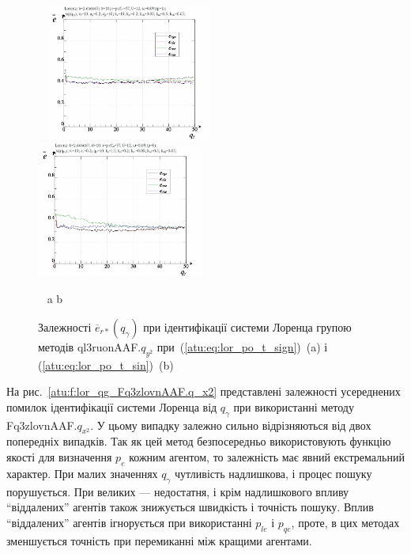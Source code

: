 \begin{figure}[ht!]
  \begin{center}
    ~ \hfill
    \includegraphics[width=0.49\textwidth]{p/cha/lor/ql3ruonAAF/lor_ql3ruonAAF_qy2-p_qgamma_e_sign.png}
    \hfill
    \includegraphics[width=0.49\textwidth]{p/cha/lor/ql3ruonAAF/lor_ql3ruonAAF_qy2-p_qgamma_e_sin.png}
    \hfill ~
  \end{center}
  \vspace{-1.0ex}
  \begin{center}
    ~ \hfill a \hfill\hfill b \hfill ~
  \end{center}
  \vspace{-1.5ex}
  \caption{Залежності $ \overline{e}_{r *} (q_\gamma) $ при ідентифікації системи Лоренца групою методів ql3ruonAAF.$q_{y^2} $ при~(\ref{atu:eq:lor_po_t_sign})~(a) і (\ref{atu:eq:lor_po_t_sin})~(b)}
  \label{atu:f:lor_qg_ql3ruonAAF.q_y2}
\end{figure}


На рис.~\ref{atu:f:lor_qg_Fq3zlovnAAF.q_x2} представлені залежності усереднених
помилок ідентифікації системи Лоренца від
$ q_\gamma $ при використанні методу
Fq3zlovnAAF.$q_{x^2}$.
У цьому випадку залежно сильно відрізняються від двох
попередніх випадків. Так як цей метод безпосередньо
використовують функцію якості для визначення
$ p_e $ кожним агентом, то залежність має явний екстремальний
характер. При малих значеннях
$ q_\gamma $ чутливість надлишкова, і процес пошуку порушується. При
великих --- недостатня, і крім надлишкового впливу ``віддалених''
агентів також знижується швидкість і точність пошуку. Вплив
``віддалених'' агентів ігнорується при використанні
$ p_{le} $ і
$ p_{qe} $, проте, в цих методах зменшується точність при перемиканні
між кращими агентами.


